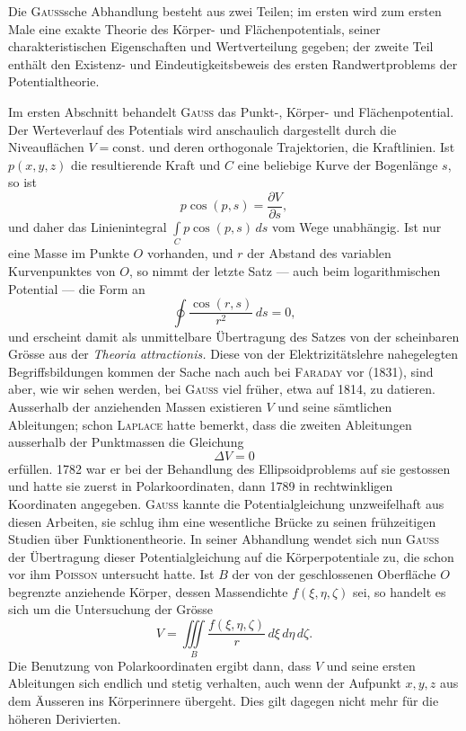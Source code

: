 Die \textsc{Gauss}sche Abhandlung besteht aus zwei Teilen; im ersten wird zum
ersten Male eine exakte Theorie des Körper- und Flächenpotentials, seiner charakteristischen
Eigenschaften und Wertverteilung gegeben; der zweite Teil
\clearpage{}
\noindent enthält den Existenz- und Eindeutigkeitsbeweis des ersten Randwertproblems
der Potentialtheorie.

Im ersten Abschnitt behandelt \textsc{Gauss} das Punkt-, Körper- und Flächenpotential.
Der Werteverlauf des Potentials wird anschaulich dargestellt durch
die Niveauflächen \(V=\mathrm{const.}\) und deren orthogonale Trajektorien, die Kraftlinien.
Ist \(p(x,y,z)\) die resultierende Kraft und \(C\) eine beliebige Kurve der
Bogenlänge \(s\), so ist
\[
p\cos(p,s)=\frac{\partial V}{\partial s},\tag{3}
\]
\noindent und daher das Linienintegral \(\int\limits_C p\cos(p,s)\,ds\) vom Wege unabhängig. Ist nur
eine Masse im Punkte \(O\) vorhanden, und \(r\) der Abstand des variablen Kurvenpunktes
von \(O\), so nimmt der letzte Satz — auch beim logarithmischen Potential — die Form an
\[
\oint\frac{\cos(r,s)}{r^2}\,ds=0,\tag{4}
\]
\noindent und erscheint damit als unmittelbare Übertragung des Satzes von der scheinbaren
Grösse aus der \textit{Theoria attractionis.} Diese von der Elektrizitätslehre
nahegelegten Begriffsbildungen kommen der Sache nach auch bei \textsc{Faraday} vor
(1831), sind aber, wie wir sehen werden, bei \textsc{Gauss} viel früher, etwa auf 1814,
zu datieren. Ausserhalb der anziehenden Massen existieren \(V\) und seine sämtlichen
Ableitungen; schon \textsc{Laplace} hatte bemerkt, dass die zweiten Ableitungen
ausserhalb der Punktmassen die Gleichung
\[
\Delta V=0\tag{5}
\]
\noindent erfüllen. 1782 war er bei der Behandlung des Ellipsoidproblems auf sie gestossen
und hatte sie zuerst in Polarkoordinaten, dann 1789 in rechtwinkligen
Koordinaten angegeben. \textsc{Gauss} kannte die Potentialgleichung unzweifelhaft aus
diesen Arbeiten, sie schlug ihm eine wesentliche Brücke zu seinen frühzeitigen
Studien über Funktionentheorie. In seiner Abhandlung wendet sich nun \textsc{Gauss}
der Übertragung dieser Potentialgleichung auf die Körperpotentiale zu, die
schon vor ihm \textsc{Poisson} untersucht hatte. Ist \(B\) der von der geschlossenen
Oberfläche \(O\) begrenzte anziehende Körper, dessen Massendichte \(f(\xi,\eta,\zeta)\) sei,
so handelt es sich um die Untersuchung der Grösse
\[
V=\iiint\limits_B\frac{f(\xi,\eta,\zeta)}{r}\,d\xi\,d\eta\,d\zeta.\tag{6}
\]
\clearpage{}
\noindent Die Benutzung von Polarkoordinaten ergibt dann, dass \(V\) und seine ersten Ableitungen
sich endlich und stetig verhalten, auch wenn der Aufpunkt \(x,y,z\)
aus dem Äusseren ins Körperinnere übergeht. Dies gilt dagegen nicht mehr
für die höheren Derivierten.

